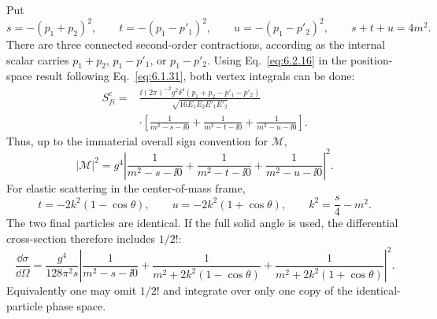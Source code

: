 \ExerciseEditorialNote

\begin{enumerate}
Put
\[
 s=-(p_1+p_2)^2,\qquad
 t=-(p_1-p'_1)^2,\qquad
 u=-(p_1-p'_2)^2,
\qquad s+t+u=4m^2 .
\]
There are three connected second-order contractions, according as the
internal scalar carries \(p_1+p_2\), \(p_1-p'_1\), or \(p_1-p'_2\).
Using Eq.~\eqref{eq:6.2.16} in the position-space result following
Eq.~\eqref{eq:6.1.31}, both vertex integrals can be done:
\[
 \begin{split}
 S^c_{fi}
 ={}&\frac{\ii(2\pi)^{-2}g^2
 \delta^4(p_1+p_2-p'_1-p'_2)}
 {\sqrt{16E_1E_2E'_1E'_2}}\\
 &\cdot\left[
 \frac1{m^2-s-\ii0}
 +\frac1{m^2-t-\ii0}
 +\frac1{m^2-u-\ii0}\right].
 \end{split}
\]
Thus, up to the immaterial overall sign convention for \(\mathcal M\),
\[
 |\mathcal M|^2
 =g^4\left|
 \frac1{m^2-s-\ii0}
 +\frac1{m^2-t-\ii0}
 +\frac1{m^2-u-\ii0}\right|^2 .
\]
For elastic scattering in the center-of-mass frame,
\[
 t=-2k^2(1-\cos\theta),\qquad
 u=-2k^2(1+\cos\theta),\qquad
 k^2=\frac{s}{4}-m^2 .
\]
The two final particles are identical.  If the full solid angle is used,
the differential cross-section therefore includes \(1/2!\):
\[
 \boxed{\;
 \frac{\dd\sigma}{\dd\Omega}
 =\frac{g^4}{128\pi^2s}
 \left|
 \frac1{m^2-s-\ii0}
 +\frac1{m^2+2k^2(1-\cos\theta)}
 +\frac1{m^2+2k^2(1+\cos\theta)}
 \right|^2 .\;}
\]
Equivalently one may omit \(1/2!\) and integrate over only one copy of
the identical-particle phase space.


\end{enumerate}

